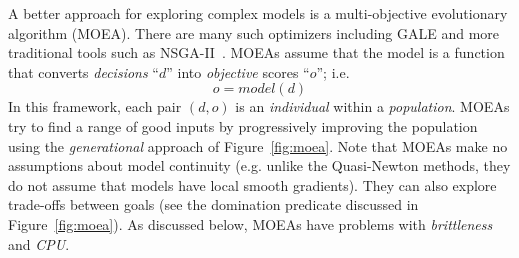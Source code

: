 \documentclass[journal]{IEEEtran}
\newcommand{\fig}[1]{Figure~\ref{fig:#1}}
\begin{document}
A better approach for exploring complex models is a multi-objective evolutionary algorithm (MOEA). 
There are many such optimizers including GALE and more traditional tools such as NSGA-II~\cite{deb00afast}.
MOEAs assume that the model is a function that converts  {\em decisions} ``$d$'' into {\em objective} scores ``$o$''; i.e.
\[
o = \mathit{model}(d)
\]
In this framework, each pair $(d,o)$ is an {\em individual} within a {\em population}. 
MOEAs try to find a range of good inputs by progressively improving the population using the {\em generational} approach of  \fig{moea}.
Note that MOEAs  make no assumptions about model continuity (e.g. unlike the Quasi-Newton methods, they do not assume that models have local smooth gradients). 
They can also explore trade-offs between goals (see the domination predicate discussed in \fig{moea}). 
As discussed below, MOEAs have problems with {\em brittleness} and {\em CPU}.




\end{document}
